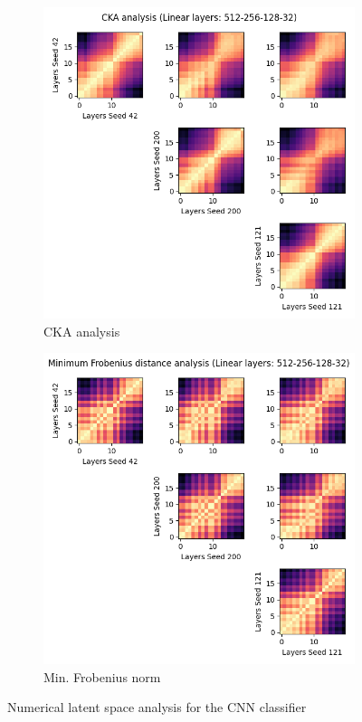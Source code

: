\documentclass[../main.tex]{subfiles}
\begin{document}
\begin{figure}[ht!]
     \centering
    \begin{subfigure}[b]{0.45\textwidth}
         \centering
        \includegraphics[width=\textwidth]{figures/rs/sim_cls/cka_512-256-128-32__42_200_121.png} 
        \caption{CKA analysis}
        \label{fig:cka_cls}
     \end{subfigure}\hfill
      \begin{subfigure}[b]{0.45\textwidth}
         \centering
         \includegraphics[width=\textwidth]{figures/rs/sim_cls/frob_512-256-128-32__42_200_121.png}
        \caption{Min. Frobenius norm}
         \label{fig:frob_cls}
     \end{subfigure}
    \caption{Numerical latent space analysis for the CNN classifier}
    \label{fig:lat_num_cls}
\end{figure}
\end{document}

